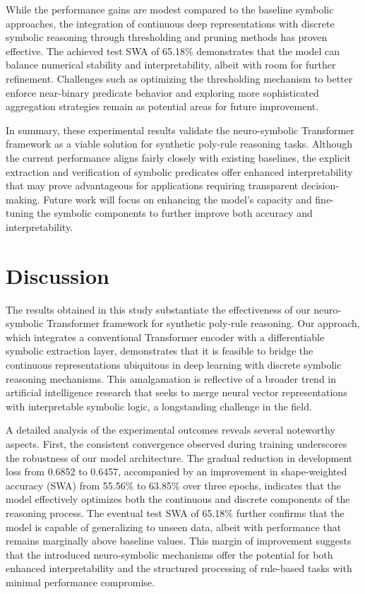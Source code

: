 \documentclass{article}
\begin{document}
While the performance gains are modest compared to the baseline symbolic approaches, the integration of continuous deep representations with discrete symbolic reasoning through thresholding and pruning methods has proven effective. The achieved test SWA of 65.18\% demonstrates that the model can balance numerical stability and interpretability, albeit with room for further refinement. Challenges such as optimizing the thresholding mechanism to better enforce near-binary predicate behavior and exploring more sophisticated aggregation strategies remain as potential areas for future improvement.

In summary, these experimental results validate the neuro-symbolic Transformer framework as a viable solution for synthetic poly-rule reasoning tasks. Although the current performance aligns fairly closely with existing baselines, the explicit extraction and verification of symbolic predicates offer enhanced interpretability that may prove advantageous for applications requiring transparent decision-making. Future work will focus on enhancing the model’s capacity and fine-tuning the symbolic components to further improve both accuracy and interpretability.

\section{Discussion}
The results obtained in this study substantiate the effectiveness of our neuro‐symbolic Transformer framework for synthetic poly‐rule reasoning. Our approach, which integrates a conventional Transformer encoder with a differentiable symbolic extraction layer, demonstrates that it is feasible to bridge the continuous representations ubiquitous in deep learning with discrete symbolic reasoning mechanisms. This amalgamation is reflective of a broader trend in artificial intelligence research that seeks to merge neural vector representations with interpretable symbolic logic, a longstanding challenge in the field.

A detailed analysis of the experimental outcomes reveals several noteworthy aspects. First, the consistent convergence observed during training underscores the robustness of our model architecture. The gradual reduction in development loss from 0.6852 to 0.6457, accompanied by an improvement in shape-weighted accuracy (SWA) from 55.56\% to 63.85\% over three epochs, indicates that the model effectively optimizes both the continuous and discrete components of the reasoning process. The eventual test SWA of 65.18\% further confirms that the model is capable of generalizing to unseen data, albeit with performance that remains marginally above baseline values. This margin of improvement suggests that the introduced neuro‐symbolic mechanisms offer the potential for both enhanced interpretability and the structured processing of rule-based tasks with minimal performance compromise.
\end{document}
